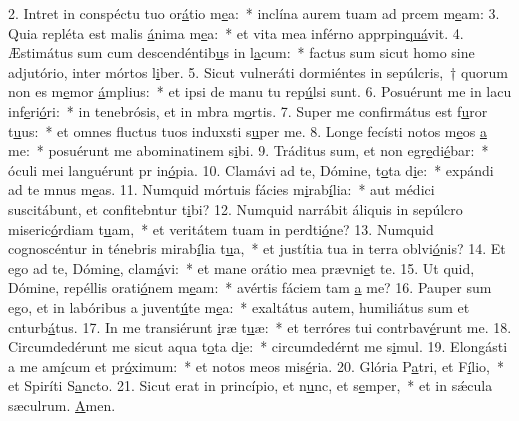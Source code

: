 2. Intret in conspéctu tuo or\uline{á}tio m\uline{e}a:~* inclína aurem tuam ad prcem m\uline{e}am:
3. Quia repléta est malis \uline{á}nima m\uline{e}a:~* et vita mea inférno apprpin\uline{quá}vit.
4. Æstimátus sum cum descendéntib\uline{u}s in l\uline{a}cum:~* factus sum sicut homo sine adjutório, inter mórtos l\uline{i}ber.
5. Sicut vulneráti dormiéntes in sepúlcris,~† quorum non es m\uline{e}mor \uline{á}mplius:~* et ipsi de manu tu rep\uline{ú}lsi sunt.
6. Posuérunt me in lacu inf\uline{e}ri\uline{ó}ri:~* in tenebrósis, et in mbra m\uline{o}rtis.
7. Super me confirmátus est f\uline{u}ror t\uline{u}us:~* et omnes fluctus tuos induxsti s\uline{u}per me.
8. Longe fecísti notos m\uline{e}os \uline{a} me:~* posuérunt me abominatinem s\uline{i}bi.
9. Tráditus sum, et non egr\uline{e}di\uline{é}bar:~* óculi mei languérunt pr in\uline{ó}pia.
10. Clamávi ad te, Dómine, t\uline{o}ta d\uline{i}e:~* expándi ad te mnus m\uline{e}as.
11. Numquid mórtuis fácies m\uline{i}rab\uline{í}lia:~* aut médici suscitábunt, et confitebntur t\uline{i}bi?
12. Numquid narrábit áliquis in sepúlcro miseric\uline{ó}rdiam t\uline{u}am,~* et veritátem tuam in perdti\uline{ó}ne?
13. Numquid cognoscéntur in ténebris mirab\uline{í}lia t\uline{u}a,~* et justítia tua in terra oblvi\uline{ó}nis?
14. Et ego ad te, Dómin\uline{e}, clam\uline{á}vi:~* et mane orátio mea prævni\uline{e}t te.
15. Ut quid, Dómine, repéllis orati\uline{ó}nem m\uline{e}am:~* avértis fáciem tam \uline{a} me?
16. Pauper sum ego, et in labóribus a juvent\uline{ú}te m\uline{e}a:~* exaltátus autem, humiliátus sum et cnturb\uline{á}tus.
17. In me transiérunt \uline{i}ræ t\uline{u}æ:~* et terróres tui contrbav\uline{é}runt me.
18. Circumdedérunt me sicut aqua t\uline{o}ta d\uline{i}e:~* circumdedérnt me s\uline{i}mul.
19. Elongásti a me am\uline{í}cum et pr\uline{ó}ximum:~* et notos meos  mis\uline{é}ria.
20. Glória P\uline{a}tri, et F\uline{í}lio,~* et Spiríti S\uline{a}ncto.
21. Sicut erat in princípio, et n\uline{u}nc, et s\uline{e}mper,~* et in sǽcula sæculrum. \uline{A}men.
